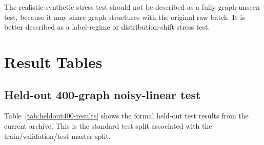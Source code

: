 \documentclass[11pt]{article}
\begin{document}
The realistic-synthetic stress test should not be described as a fully
graph-unseen test, because it may share graph structures with the original raw
batch. It is better described as a label-regime or distribution-shift stress
test.

\section{Result Tables}

\subsection{Held-out 400-graph noisy-linear test}

Table~\ref{tab:heldout400-results} shows the formal held-out test results from
the current archive. This is the standard test split associated with the
train/validation/test master split.

\begin{table}[h]
\centering
\caption{Held-out 400-graph noisy-linear test results. Positive paired
improvement means e2e has a smaller decision gap than 2stage on the same test
graphs.}
\label{tab:heldout400-results}
\end{table}
\end{document}
